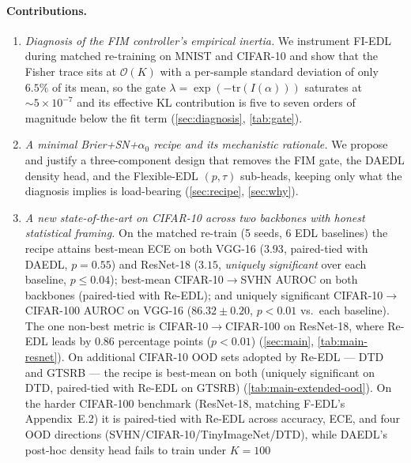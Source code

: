\documentclass[review,5p,times]{elsarticle}
\begin{document}
\paragraph{Contributions.}
\begin{enumerate}
  \item \emph{Diagnosis of the FIM controller's empirical inertia.} We
        instrument FI-EDL during matched re-training on MNIST and CIFAR-10
        and show that the Fisher trace sits at $\mathcal{O}(K)$ with a
        per-sample standard deviation of only $6.5\%$ of its mean, so the
        gate $\lambda\!=\!\exp(-\mathrm{tr}(I(\alpha)))$ saturates at
        $\sim\!5\!\times\!10^{-7}$ and its effective KL contribution is
        five to seven orders of magnitude below the fit
        term (\autoref{sec:diagnosis}, \autoref{tab:gate}).
  \item \emph{A minimal Brier+SN+$\alpha_0$ recipe and its mechanistic
        rationale.} We propose and justify a three-component design that
        removes the FIM gate, the DAEDL density head, and the Flexible-EDL
        $(p,\tau)$ sub-heads, keeping only what the diagnosis implies is
        load-bearing (\autoref{sec:recipe}, \autoref{sec:why}).
  \item \emph{A new state-of-the-art on CIFAR-10 across two backbones
        with honest statistical framing.} On the matched re-train (5
        seeds, 6 EDL baselines) the recipe attains best-mean ECE on
        both VGG-16 ($3.93$, paired-tied with DAEDL, $p\!=\!0.55$) and
        ResNet-18 ($3.15$, \emph{uniquely significant} over each
        baseline, $p\!\le\!0.04$); best-mean CIFAR-10$\to$SVHN AUROC on
        both backbones (paired-tied with Re-EDL); and uniquely
        significant CIFAR-10$\to$CIFAR-100 AUROC on VGG-16
        ($86.32\!\pm\!0.20$, $p\!<\!0.01$ vs.\ each baseline). The one
        non-best metric is CIFAR-10$\to$CIFAR-100 on ResNet-18, where
        Re-EDL leads by $0.86$ percentage points ($p\!<\!0.01$)
        (\autoref{sec:main}, \autoref{tab:main-resnet}). On
        additional CIFAR-10 OOD sets adopted by Re-EDL --- DTD
        \citep{cimpoi2014describing} and GTSRB
        \citep{stallkamp2012gtsrb} --- the recipe is best-mean on both
        (uniquely significant on DTD, paired-tied with Re-EDL on GTSRB)
        (\autoref{tab:main-extended-ood}). On the harder CIFAR-100
        benchmark (ResNet-18, matching F-EDL's Appendix~E.2) it is
        paired-tied with Re-EDL across accuracy, ECE, and four OOD
        directions (SVHN/CIFAR-10/TinyImageNet/DTD), while DAEDL's
        post-hoc density head fails to train under $K\!=\!100$

\end{enumerate}
\end{document}
